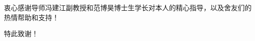 
\begin{acknowledgements}
  衷心感谢导师冯建江副教授和范博昊博士生学长对本人的精心指导，以及舍友们的热情帮助和支持！

  特此致谢！
\end{acknowledgements}
